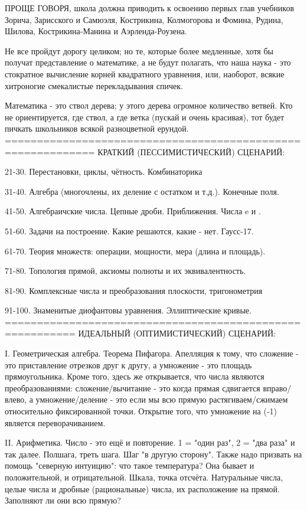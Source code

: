 ПРОЩЕ ГОВОРЯ, школа должна приводить к освоению первых глав
учебников Зорича, Зарисского и Самюэля, Кострикина, Колмогорова
и Фомина, Рудина, Шилова, Кострикина-Манина и Аэрленда-Роузена.

Не все пройдут дорогу целиком; но те, которые более медленные, хотя
бы получат представление о математике, а не будут полагать, что наша
наука - это стократное вычисление корней квадратного уравнения, или,
наоборот, всякие хитроногие смекалистые перекладывания спичек.

Математика - это ствол дерева; у этого дерева огромное количество
ветвей. Кто не ориентируется, где ствол, а где ветка (пускай и очень
красивая), тот будет пичкать школьников всякой разноцветной ерундой.
============================================================
КРАТКИЙ (ПЕССИМИСТИЧЕСКИЙ) СЦЕНАРИЙ:

21-30. Перестановки, циклы, чётность. Комбинаторика

31-40. Алгебра (многочлены, их деление с остатком и т.д.). Конечные поля.

41-50. Алгебраичские числа. Цепные дроби. Приближения. Числа e и \pi.

51-60. Задачи на построение. Какие решаются, какие - нет. Гаусс-17.

61-70. Теория множеств: операции, мощности, мера (длина и площадь).

71-80. Топология прямой, аксиомы полноты и их эквивалентность.

81-90. Комплексные числа и преобразования плоскости, тригонометрия

91-100. Знаменитые диофантовы уравнения. Эллиптические кривые.
=========================================================
ИДЕАЛЬНЫЙ (ОПТИМИСТИЧЕСКИЙ) СЦЕНАРИЙ:

I. Геометрическая алгебра. Теорема Пифагора. Апелляция к тому, что
сложение - это приставление отрезков друг к другу, а умножение - это 
площадь прямоугольника. Кроме того, здесь же открывается, что числа 
являются преобразованиями: сложение/вычитание - это когда прямая 
сдвигается вправо/влево, а умножение/деление - это если мы всю 
прямую растягиваем/сжимаем относительно фиксированной точки. 
Открытие того, что умножение на (-1) является переворачиванием.

II. Арифметика. Число - это ещё и повторение. 1 = "один раз", 2 = "два
раза" и так далее. Полшага, треть шага. Шаг "в другую сторону". Также
надо призвать на помощь "северную интуицию": что такое температура?
Она бывает и положительной, и отрицательной. Шкала, точка отсчёта.
Натуральные числа, целые числа и дробные (рациональные) числа, их
расположение на прямой. Заполняют ли они всю прямую?

